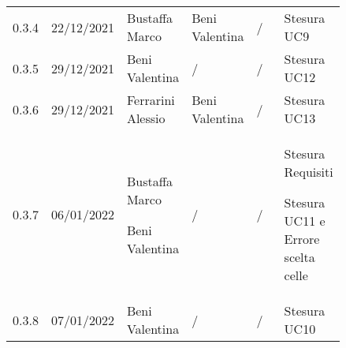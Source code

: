 {\begin{tabular}{p{0.10\linewidth}p{0.10\linewidth}p{0.15\linewidth}p{0.15\linewidth}p{0.15\linewidth}p{0.19\linewidth}}
	\rowcolor[RGB]{233, 245, 206}
	0.3.4 & 22/12/2021 & Bustaffa Marco& Beni Valentina &/& Stesura UC9\\
	\rowcolor[RGB]{216, 235, 171}
	0.3.5 & 29/12/2021 & Beni Valentina& / &/& Stesura UC12\\
	\rowcolor[RGB]{233, 245, 206}
	0.3.6 & 29/12/2021 & Ferrarini Alessio& Beni Valentina &/& Stesura UC13\\
	\rowcolor[RGB]{216, 235, 171}
	0.3.7 & 06/01/2022 & Bustaffa Marco \par Beni Valentina & / & /& Stesura Requisiti \par Stesura UC11 e Errore scelta celle\\
	\rowcolor[RGB]{233, 245, 206}
	0.3.8 & 07/01/2022 & Beni Valentina& / &/& Stesura UC10\\
\end{tabular}
}
